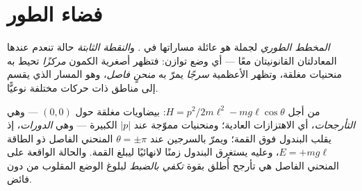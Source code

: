 \section{فضاء الطور}

\begin{definition}\label{def:b3:hamiltonian-mechanics:portrait}
\emph{المخطط الطوري} لجملة هو عائلة مساراتها في .
و\emph{النقطة الثابتة} حالة تنعدم عندها المعادلتان القانونيتان
معًا --- أي وضع توازن: فتظهر أصغرية الكمون \emph{مركزًا} تحيط به
منحنيات مغلقة، وتظهر الأعظمية \emph{سرجًا} يمرّ به \emph{منحنٍ
فاصل}، وهو المسار الذي يقسم  إلى مناطق ذات حركات
مختلفة نوعيًّا.
\end{definition}

\begin{example}\label{ex:b3:hamiltonian-mechanics:pendulum-portrait}
من أجل $H = p^2/2m\ell^2 - mg\ell\cos\theta$: بيضاويات مغلقة حول
$(0, 0)$ --- وهي \emph{التأرجحات}، أي الاهتزازات العادية؛ ومنحنيات
مموّجة عند $|p|$ الكبيرة --- وهي \emph{الدورات}، إذ يقلب البندول
فوق القمة؛ ويمرّ بالسرجين عند $\theta = \pm\pi$ المنحني الفاصل ذو
الطاقة $E = +mg\ell$، وعليه يستغرق البندول زمنًا لانهائيًا ليبلغ
القمة. والحالة الواقعة على المنحني الفاصل هي تأرجح أُطلق بقوة
\emph{تكفي بالضبط} لبلوغ الوضع المقلوب من دون فائض.
\end{example}

